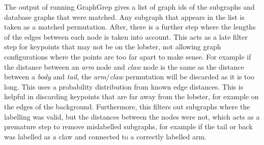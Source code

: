 The output of running GraphGrep gives a list of graph ids of the subgraphs and database graphs that were matched. Any subgraph that appears in the list is taken as a matched permutation. After, there is a further step where the lengths of the edges between each node is taken into account. This acts as a late filter step for keypoints that may not be on the lobster, not allowing graph configurations where the points are too far apart to make sense. For example if the distance between an \textit{arm} node and \textit{claw} node is the same as the distance between a \textit{body} and \textit{tail}, the \textit{arm}/\textit{claw} permutation will be discarded as it is too long. This uses a probability distribution from known edge distances. This is helpful in discarding keypoints that are far away from the lobster, for example on the edges of the background. Furthermore, this filters out subgraphs where the labelling was valid, but the distances between the nodes were not, which acts as a premature step to remove mislabelled subgraphs, for example if the tail or back was labelled as a claw and connected to a correctly labelled arm. 

